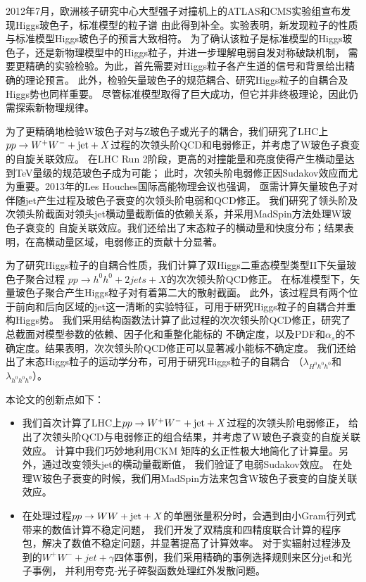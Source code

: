 ﻿
\begin{cnabstract}
2012年7月，欧洲核子研究中心大型强子对撞机上的ATLAS和CMS实验组宣布发现Higgs玻色子，标准模型的粒子谱
由此得到补全。实验表明，新发现粒子的性质与标准模型Higgs玻色子的预言大致相符。
为了确认该粒子是标准模型的Higgs玻色子，还是新物理模型中的Higgs粒子，并进一步理解电弱自发对称破缺机制，
需要更精确的实验检验。为此，首先需要对Higgs粒子各产生道的信号和背景给出精确的理论预言。
此外，检验矢量玻色子的规范耦合、研究Higgs粒子的自耦合及Higgs势也同样重要。
尽管标准模型取得了巨大成功，但它并非终极理论，因此仍需探索新物理规律。

为了更精确地检验W玻色子对与Z玻色子或光子的耦合，我们研究了LHC上
$pp\to W^+W^-+{\rm jet}+X$过程的次领头阶QCD和电弱修正，并考虑了W玻色子衰变的自旋关联效应。
在LHC Run 2阶段，更高的对撞能量和亮度使得产生横动量达到TeV量级的规范玻色子成为可能；
此时，次领头阶电弱修正因Sudakov效应而尤为重要。2013年的Les Houches国际高能物理会议也强调，
亟需计算矢量玻色子对伴随jet产生过程及玻色子衰变的次领头阶电弱和QCD修正。
我们研究了领头阶及次领头阶截面对领头jet横动量截断值的依赖关系，并采用MadSpin方法处理W玻色子衰变的
自旋关联效应。我们还给出了末态粒子的横动量和快度分布；结果表明，在高横动量区域，电弱修正的贡献十分显著。

为了研究Higgs粒子的自耦合性质，我们计算了双Higgs二重态模型类型II下矢量玻色子聚合过程
$pp\to h^0h^0+2jets+X$的次次领头阶QCD修正。
在标准模型下，矢量玻色子聚合产生Higgs粒子对有着第二大的散射截面。
此外，该过程具有两个位于前向和后向区域的jet这一清晰的实验特征，可用于研究Higgs粒子的自耦合并重构Higgs势。
我们采用结构函数法计算了此过程的次次领头阶QCD修正，研究了总截面对模型参数的依赖、因子化和重整化能标的
不确定度，以及PDF和$\alpha_s$的不确定度。结果表明，次次领头阶QCD修正可以显著减小能标不确定度。
我们还给出了末态Higgs粒子的运动学分布，可用于研究Higgs粒子的自耦合
（$\lambda_{H^0h^0h^0}$和$\lambda_{h^0h^0h^0}$）。


本论文的创新点如下：
\begin{itemize}
\item 我们首次计算了LHC上$pp\to W^+W^-+{\rm jet}+X$过程的次领头阶电弱修正，
给出了次领头阶QCD与电弱修正的组合结果，并考虑了W玻色子衰变的自旋关联效应。
计算中我们巧妙地利用CKM 矩阵的幺正性极大地简化了计算量。另外，通过改变领头jet的横动量截断值，
我们验证了电弱Sudakov效应。
在处理W玻色子衰变的时候，我们用MadSpin方法来包含W玻色子衰变的自旋关联效应。

\item 在处理过程$pp\to WW+{\rm jet}+X$的单圈张量积分时，会遇到由小Gram行列式带来的数值计算不稳定问题，
我们开发了双精度和四精度联合计算的程序包，解决了数值不稳定问题，并显著提高了计算效率。
对于实辐射过程涉及到的$W^+W^-+jet+\gamma$四体事例，我们采用精确的事例选择规则来区分jet和光子事例，
并利用夸克-光子碎裂函数处理红外发散问题。


\end{itemize}
\end{cnabstract}
